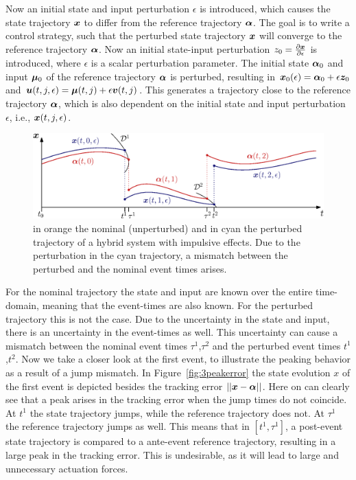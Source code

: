 \documentclass[../DC2017114Bouma.tex]{subfiles}
\begin{document}
Now an initial state and input perturbation $\epsilon$ is introduced, which causes the state trajectory ${\boldsymbol{x}}$ to differ from the reference trajectory $\boldsymbol{\alpha}$. The goal is to write a control strategy, such that the perturbed state trajectory ${\boldsymbol{x}}$ will converge to the reference trajectory $\boldsymbol{\alpha}$. Now an initial state-input perturbation $z_0 = \frac{\partial{\boldsymbol{x}}}{\partial\epsilon}$ is introduced, where $\epsilon$ is a scalar perturbation parameter. The initial state $\boldsymbol{\alpha}_0$ and input $\boldsymbol{\mu}_0$ of the reference trajectory $\boldsymbol{\alpha}$ is perturbed, resulting in ${\boldsymbol{x}}_0(\epsilon) = \boldsymbol{\alpha}_0 + \epsilon{\boldsymbol{z}}_0$ and ${\boldsymbol{u}}(t,j,\epsilon) = \boldsymbol{\mu}(t,j) + \epsilon{\boldsymbol{v}}(t,j)$. This generates a trajectory close to the reference trajectory $\boldsymbol{\alpha}$, which is also dependent on the initial state and input perturbation $\epsilon$, i.e., ${\boldsymbol{x}}(t,j,\epsilon)$. 

%
%
\begin{figure}[h]
\centering
\includegraphics[width=.9\textwidth]{perturbedtraj.eps}\caption{in orange the nominal (unperturbed) and in cyan the perturbed trajectory of a hybrid system with impulsive effects. Due to the perturbation in the cyan trajectory, a mismatch between the perturbed and the nominal event times arises.} \label{fig:3perturbedtraj}
\end{figure}
For the nominal trajectory the state and input are known over the entire time-domain, meaning that the event-times are also known. For the perturbed trajectory this is not the case. Due to the uncertainty in the state and input, there is an uncertainty in the event-times as well. This uncertainty can cause a mismatch between the nominal event times $\tau^1$,$\tau^2$ and the perturbed event times $t^1$,$t^2$. Now we take a closer look at the first event, to illustrate the peaking behavior as a result of a jump mismatch. In Figure~\ref{fig:3peakerror} the state evolution $x$ of the first event is depicted besides the tracking error $||{\boldsymbol{x}}-\boldsymbol{\alpha}||$. Here on can clearly see that a peak arises in the tracking error when the jump times do not coincide. At $t^1$ the state trajectory jumps, while the reference trajectory does not. At $\tau^1$ the reference trajectory jumps as well. This means that in $[t^1,\tau^1]$, a post-event state trajectory is compared to a ante-event reference trajectory, resulting in a large peak in the tracking error. This is undesirable, as it will lead to large and unnecessary actuation forces.
\end{document}
